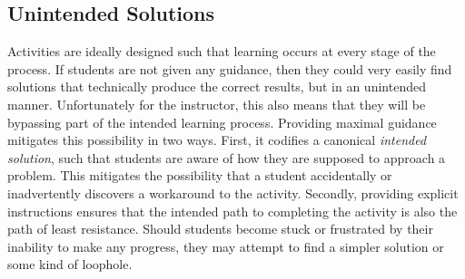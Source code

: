 
    \subsection{Unintended Solutions}
        Activities are ideally designed such that learning occurs at every stage of the process. 
        If students are not given any guidance, then they could very easily find solutions that technically produce the correct results, but in an unintended manner. 
        Unfortunately for the instructor, this also means that they will be bypassing part of the intended learning process. 
        Providing maximal guidance mitigates this possibility in two ways. 
        First, it codifies a canonical \emph{intended solution}, such that students are aware of how they are supposed to approach a problem. 
        This mitigates the possibility that a student accidentally or inadvertently discovers a workaround to the activity. 
        Secondly, providing explicit instructions ensures that the intended path to completing the activity is also the path of least resistance. 
        Should students become stuck or frustrated by their inability to make any progress, they may attempt to find a simpler solution or some kind of loophole. 




        

